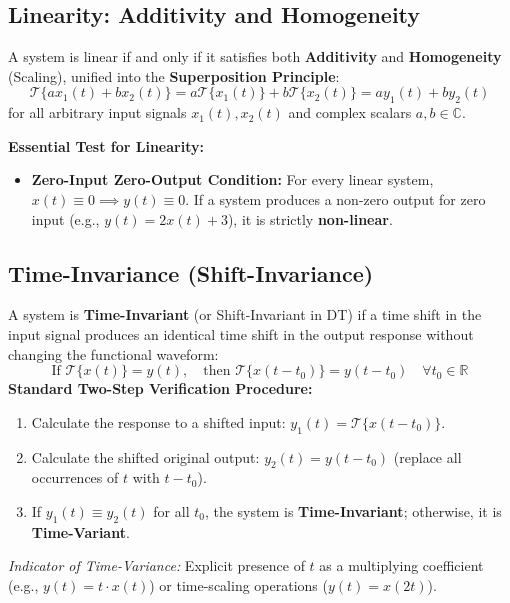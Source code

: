 \documentclass[12pt,a4paper]{article}
\begin{document}
\subsection{Linearity: Additivity and Homogeneity}
\begin{tcolorbox}[defbox, title={\textbf{The Linearity Property and Superposition Principle}}]
A system is linear if and only if it satisfies both \textbf{Additivity} and \textbf{Homogeneity} (Scaling), unified into the \textbf{Superposition Principle}:
\begin{equation}
  \mathcal{T}\{a x_1(t) + b x_2(t)\} = a \mathcal{T}\{x_1(t)\} + b \mathcal{T}\{x_2(t)\} = a y_1(t) + b y_2(t)
\end{equation}
for all arbitrary input signals $x_1(t), x_2(t)$ and complex scalars $a, b \in \mathbb{C}$.

\textbf{Essential Test for Linearity:}
\begin{itemize}[leftmargin=*, itemsep=3pt]
  \item \textbf{Zero-Input Zero-Output Condition:} For every linear system, $x(t) \equiv 0 \implies y(t) \equiv 0$. If a system produces a non-zero output for zero input (e.g., $y(t) = 2x(t) + 3$), it is strictly \textbf{non-linear}.
\end{itemize}
\end{tcolorbox}

\subsection{Time-Invariance (Shift-Invariance)}
\begin{tcolorbox}[defbox, title={\textbf{Time-Invariance (Shift-Invariance) Condition}}]
A system is \textbf{Time-Invariant} (or Shift-Invariant in DT) if a time shift in the input signal produces an identical time shift in the output response without changing the functional waveform:
\begin{equation}
  \text{If } \mathcal{T}\{x(t)\} = y(t), \quad \text{then } \mathcal{T}\{x(t - t_0)\} = y(t - t_0) \quad \forall t_0 \in \mathbb{R}
\end{equation}
\textbf{Standard Two-Step Verification Procedure:}
\begin{enumerate}[label=\arabic*., leftmargin=*]
  \item Calculate the response to a shifted input: $y_1(t) = \mathcal{T}\{x(t - t_0)\}$.
  \item Calculate the shifted original output: $y_2(t) = y(t - t_0)$ (replace all occurrences of $t$ with $t - t_0$).
  \item If $y_1(t) \equiv y_2(t)$ for all $t_0$, the system is \textbf{Time-Invariant}; otherwise, it is \textbf{Time-Variant}.
\end{enumerate}
\textit{Indicator of Time-Variance:} Explicit presence of $t$ as a multiplying coefficient (e.g., $y(t) = t \cdot x(t)$) or time-scaling operations ($y(t) = x(2t)$).
\end{tcolorbox}
\end{document}
